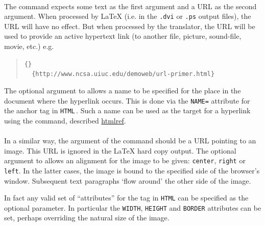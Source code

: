 %
%
\paragraph*{\label{addnormlink}}
The  command expects some text as the first argument 
and a URL as the second argument. 
When processed by \LaTeX{}  (i.e. in the \texttt{.dvi} or \texttt{.ps} output files), 
the URL will have no effect. But when processed by the translator, 
the URL will be used to provide an active hypertext link
(to another file, picture, sound-file, movie, etc.) e.g.
\begin{quote}
\begin{small}
\verb|{|\verb|}|\\
\verb|  {http://www.ncsa.uiuc.edu/demoweb/url-primer.html}|
\end{small}
\end{quote}

%
\noindent
The optional argument to  allows a name to be
specified for the place in the document where the hyperlink occurs.
This is done via the \texttt{NAME=}\texttt{} attribute
for the  anchor tag in \texttt{HTML}\,. 
Such a name can be used as the target for a hyperlink using the  command, 
described \hyperref{later}{in Section~}{}{htmlref}.


%
\paragraph*{\label{htmladdimg}}
In a similar way, the argument of the  command 
should be a URL pointing to an image. 
This URL is ignored in the \LaTeX{}  hard copy output. 
The optional argument to  allows an alignment
for the image to be given:  \texttt{center}, \texttt{right} or \texttt{left}.
In the latter cases, the image is bound to the specified side
of the browser's window. Subsequent text paragraphs `flow around' the
other side of the image.

\html{\\}
%
In fact any valid set of ``attributes'' for the  tag in \texttt{HTML} 
can be specified as the optional  parameter. In particular
the \texttt{WIDTH}, \texttt{HEIGHT} and \texttt{BORDER} attributes can be set,
perhaps overriding the natural size of the image.

